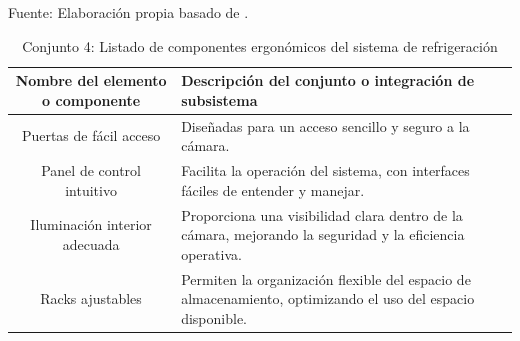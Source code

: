 	
	\begin{table}[H]
		\centering
		\caption{Conjunto 4: Listado de componentes ergonómicos del sistema de refrigeración}
		Fuente: Elaboración propia basado de .
			\begin{tabular}{@{}cl@{}}
		\toprule
	 \begin{minipage}[t]{0.25\linewidth}\textbf{Nombre del elemento o componente}\end{minipage} & \begin{minipage}[t]{0.60\linewidth}\textbf{Descripción del conjunto o integración de subsistema}\end{minipage} \\ \midrule
			Puertas de fácil acceso                   & \begin{minipage}[t]{0.6\linewidth}Diseñadas para un acceso sencillo y seguro a la cámara.\end{minipage} \\
			 Panel de control intuitivo                & \begin{minipage}[t]{0.6\linewidth}Facilita la operación del sistema, con interfaces fáciles de entender y manejar.\end{minipage} \\
			 Iluminación interior adecuada             & \begin{minipage}[t]{0.6\linewidth}Proporciona una visibilidad clara dentro de la cámara, mejorando la seguridad y la eficiencia operativa.\end{minipage} \\
			Racks ajustables                          & \begin{minipage}[t]{0.6\linewidth}Permiten la organización flexible del espacio de almacenamiento, optimizando el uso del espacio disponible.\end{minipage} \\ \bottomrule
		\end{tabular}
	\label{tabla:ergonomia}
	\end{table}
	
	 














































